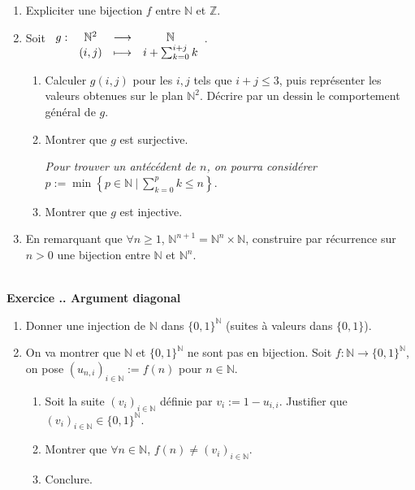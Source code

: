 \documentclass{article}
\newcommand{\fonction}[5]{\raisebox{-0.5\baselineskip}{$\begin{array}{lccc}
    #1: & #2 & \longrightarrow & #3 \\
        & #4 & \longmapsto & #5 \end{array}$}}
\newcommand{\mb}[1]{\mathbb{#1}}
\newcounter{exo}
\newcommand{\exercice}[1][\null]{\textbf{\\ \large Exercice \thesection.\theexo. \normalsize #1} \addtocounter{exo}{1}}
\begin{document}
\begin{enumerate}

\item Expliciter une bijection $f$ entre $\mb{N}$ et $\mb{Z}$.

\item Soit $\fonction{g}{\mb{N}^2}{\mb{N}}{(i,j)}{ i + \sum_{k=0}^{i+j} k}$.

\begin{enumerate}

\item Calculer $g(i,j)$ pour les $i,j$ tels que $i+j \le 3$, puis représenter les valeurs obtenues sur le plan $\mb{N}^2$. Décrire par un dessin le comportement général de $g$.

\item Montrer que $g$ est surjective.

\emph{Pour trouver un antécédent de $n$, on pourra considérer $p := \min \left\{ p \in \mb{N}~|~ \sum_{k=0}^{p} k \le n\right\}$}.

\item Montrer que $g$ est injective.

\end{enumerate}

\item En remarquant que $\forall n \ge 1$, $\mb{N}^{n+1} = \mb{N}^n \times \mb{N}$, construire par récurrence sur $n > 0$ une bijection entre $\mb{N}$ et $\mb{N}^n$.

\end{enumerate}




\exercice[Argument diagonal]

\begin{enumerate}

\item Donner une injection de $\mb{N}$ dans $\{0,1\}^{\mb{N}}$ (suites à valeurs dans $\{0,1\}$).

\item On va montrer que  $\mb{N}$ et $\{0,1\}^{\mb{N}}$ ne sont pas en bijection. Soit $f : \mb{N} \rightarrow \{0,1\}^{\mb{N}}$, on pose $(u_{n,i})_{i \in \mb{N}} := f(n)$ pour $n \in \mb{N}$.

\begin{enumerate}

\item Soit la suite $(v_i)_{i \in \mb{N}}$ définie par $v_i := 1 - u_{i,i}$. Justifier que $(v_i)_{i \in \mb{N}} \in \{0,1\}^{\mb{N}}$. 

\item Montrer que $\forall n \in \mb{N}$, $ f(n)\neq (v_i )_{i \in \mb{N}}$.

\item Conclure.

\end{enumerate}

\end{enumerate}
\end{document}
